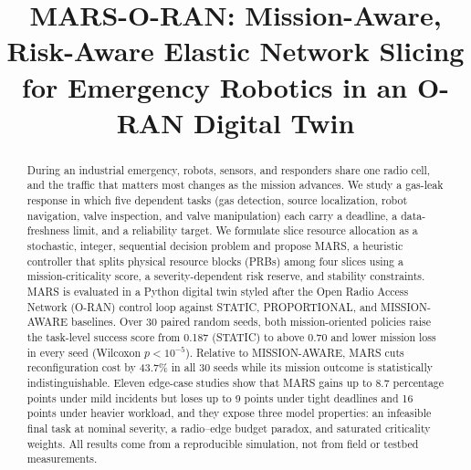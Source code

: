 \documentclass[conference]{IEEEtran}
\begin{document}
\title{MARS-O-RAN: Mission-Aware, Risk-Aware Elastic Network Slicing for Emergency Robotics in an O-RAN Digital Twin}

\author{
\and
{}
\and
{}
\and
{}
}

\maketitle

\begin{abstract}
During an industrial emergency, robots, sensors, and responders share one radio cell, and the traffic that matters most changes as the mission advances. We study a gas-leak response in which five dependent tasks (gas detection, source localization, robot navigation, valve inspection, and valve manipulation) each carry a deadline, a data-freshness limit, and a reliability target. We formulate slice resource allocation as a stochastic, integer, sequential decision problem and propose MARS, a heuristic controller that splits physical resource blocks (PRBs) among four slices using a mission-criticality score, a severity-dependent risk reserve, and stability constraints. MARS is evaluated in a Python digital twin styled after the Open Radio Access Network (O-RAN) control loop against STATIC, PROPORTIONAL, and MISSION-AWARE baselines. Over 30 paired random seeds, both mission-oriented policies raise the task-level success score from 0.187 (STATIC) to above 0.70 and lower mission loss in every seed (Wilcoxon $p<10^{-5}$). Relative to MISSION-AWARE, MARS cuts reconfiguration cost by 43.7\% in all 30 seeds while its mission outcome is statistically indistinguishable. Eleven edge-case studies show that MARS gains up to 8.7 percentage points under mild incidents but loses up to 9 points under tight deadlines and 16 points under heavier workload, and they expose three model properties: an infeasible final task at nominal severity, a radio--edge budget paradox, and saturated criticality weights. All results come from a reproducible simulation, not from field or testbed measurements.
\end{abstract}
\end{document}
